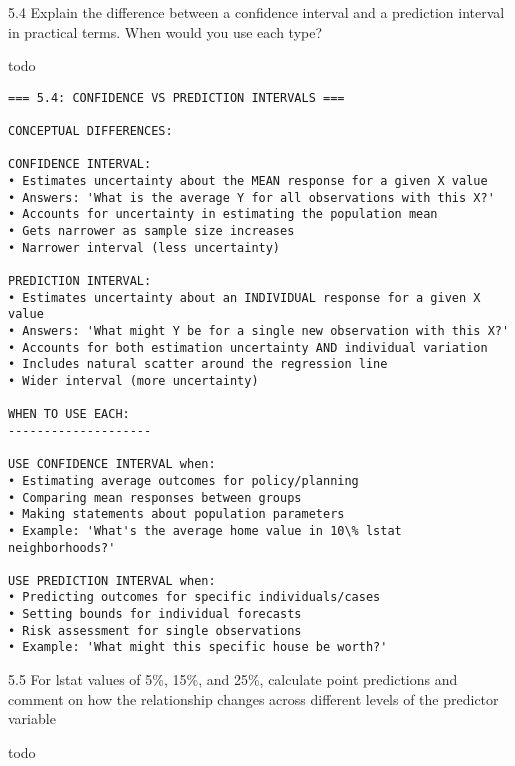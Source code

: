 \documentclass[11pt, twocolumn]{article}
\begin{document}
    5.4 Explain the difference between a confidence interval and a
prediction interval in practical terms. When would you use each type?

todo

    \begin{Verbatim}[commandchars=\\\{\}]
=== 5.4: CONFIDENCE VS PREDICTION INTERVALS ===

CONCEPTUAL DIFFERENCES:

CONFIDENCE INTERVAL:
• Estimates uncertainty about the MEAN response for a given X value
• Answers: 'What is the average Y for all observations with this X?'
• Accounts for uncertainty in estimating the population mean
• Gets narrower as sample size increases
• Narrower interval (less uncertainty)

PREDICTION INTERVAL:
• Estimates uncertainty about an INDIVIDUAL response for a given X value
• Answers: 'What might Y be for a single new observation with this X?'
• Accounts for both estimation uncertainty AND individual variation
• Includes natural scatter around the regression line
• Wider interval (more uncertainty)

WHEN TO USE EACH:
--------------------

USE CONFIDENCE INTERVAL when:
• Estimating average outcomes for policy/planning
• Comparing mean responses between groups
• Making statements about population parameters
• Example: 'What's the average home value in 10\% lstat neighborhoods?'

USE PREDICTION INTERVAL when:
• Predicting outcomes for specific individuals/cases
• Setting bounds for individual forecasts
• Risk assessment for single observations
• Example: 'What might this specific house be worth?'

    \end{Verbatim}

    5.5 For lstat values of 5\%, 15\%, and 25\%, calculate point predictions
and comment on how the relationship changes across different levels of
the predictor variable

todo
\end{document}
